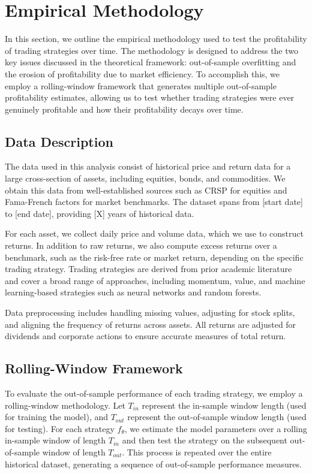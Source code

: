 \section{Empirical Methodology}

In this section, we outline the empirical methodology used to test the profitability of trading strategies over time. The methodology is designed to address the two key issues discussed in the theoretical framework: out-of-sample overfitting and the erosion of profitability due to market efficiency. To accomplish this, we employ a rolling-window framework that generates multiple out-of-sample profitability estimates, allowing us to test whether trading strategies were ever genuinely profitable and how their profitability decays over time.

\subsection{Data Description}

The data used in this analysis consist of historical price and return data for a large cross-section of assets, including equities, bonds, and commodities. We obtain this data from well-established sources such as CRSP for equities and Fama-French factors for market benchmarks. The dataset spans from [start date] to [end date], providing [X] years of historical data.

For each asset, we collect daily price and volume data, which we use to construct returns. In addition to raw returns, we also compute excess returns over a benchmark, such as the risk-free rate or market return, depending on the specific trading strategy. Trading strategies are derived from prior academic literature and cover a broad range of approaches, including momentum, value, and machine learning-based strategies such as neural networks and random forests.

Data preprocessing includes handling missing values, adjusting for stock splits, and aligning the frequency of returns across assets. All returns are adjusted for dividends and corporate actions to ensure accurate measures of total return.

\subsection{Rolling-Window Framework}

To evaluate the out-of-sample performance of each trading strategy, we employ a rolling-window methodology. Let $T_{in}$ represent the in-sample window length (used for training the model), and $T_{out}$ represent the out-of-sample window length (used for testing). For each strategy $f_{\theta}$, we estimate the model parameters over a rolling in-sample window of length $T_{in}$ and then test the strategy on the subsequent out-of-sample window of length $T_{out}$. This process is repeated over the entire historical dataset, generating a sequence of out-of-sample performance measures.


